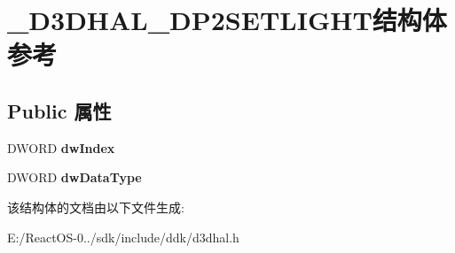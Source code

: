 \hypertarget{struct___d3_d_h_a_l___d_p2_s_e_t_l_i_g_h_t}{}\section{\+\_\+\+D3\+D\+H\+A\+L\+\_\+\+D\+P2\+S\+E\+T\+L\+I\+G\+H\+T结构体 参考}
\label{struct___d3_d_h_a_l___d_p2_s_e_t_l_i_g_h_t}
\subsection*{Public 属性}
\begin{DoxyCompactItemize}
\item 
\mbox{\label{struct___d3_d_h_a_l___d_p2_s_e_t_l_i_g_h_t_afd21bb4cacb7547e25594b580a5fc7c7}} 
D\+W\+O\+RD {\bfseries dw\+Index}
\item 
\mbox{\label{struct___d3_d_h_a_l___d_p2_s_e_t_l_i_g_h_t_a54976c959baac3af95b973d5cd6e692c}} 
D\+W\+O\+RD {\bfseries dw\+Data\+Type}
\end{DoxyCompactItemize}


该结构体的文档由以下文件生成\+:\begin{DoxyCompactItemize}
\item 
E\+:/\+React\+O\+S-\/0../sdk/include/ddk/d3dhal.\+h\end{DoxyCompactItemize}
